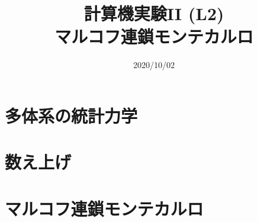 \documentclass[10pt,dvipdfmx]{beamer}
\title{計算機実験II (L2) \\ マルコフ連鎖モンテカルロ}
\date{2020/10/02}
\begin{document}
\begin{frame}
  \titlepage
  \tableofcontents
\end{frame}



\section{多体系の統計力学}






\section{数え上げ}




\section{マルコフ連鎖モンテカルロ}















\end{document}
